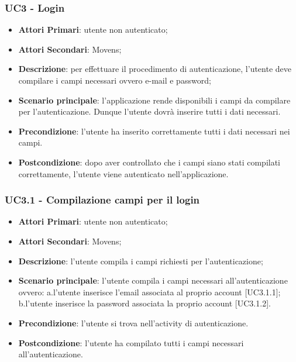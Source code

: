 
\subsubsection{UC3 - Login}
\begin{itemize}
	\item \textbf{Attori Primari}: utente non autenticato;
	\item \textbf{Attori Secondari}: Movens\glo;
	\item \textbf{Descrizione}: per effettuare il procedimento di autenticazione, l'utente deve compilare i campi necessari ovvero e-mail e password;
	\item \textbf{Scenario principale}: l'applicazione rende disponibili i campi da compilare per l'autenticazione. Dunque l'utente dovrà inserire tutti i dati necessari.
	
	\item \textbf{Precondizione}: l'utente ha inserito correttamente tutti i dati necessari nei campi.
	\item \textbf{Postcondizione}: dopo aver controllato che i campi siano stati compilati correttamente, l'utente viene autenticato nell'applicazione.	
\end{itemize}

\subsubsection{UC3.1 - Compilazione campi per il login}
\begin{itemize}
	\item \textbf{Attori Primari}: utente non autenticato;
	\item \textbf{Attori Secondari}: Movens\glo;
	\item \textbf{Descrizione}: l'utente compila i campi richiesti per l'autenticazione;
	\item \textbf{Scenario principale}: l'utente compila i campi necessari all'autenticazione ovvero: a.l'utente inserisce l'email associata al proprio account [UC3.1.1];
	\newline
	b.l'utente inserisce la password associata la proprio account [UC3.1.2].	
	\item \textbf{Precondizione}: l'utente si trova nell'activity di autenticazione.
	\item \textbf{Postcondizione}: l'utente ha compilato tutti i campi necessari all'autenticazione.	
\end{itemize}


